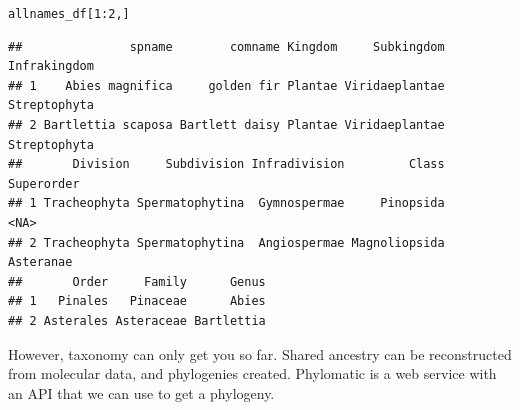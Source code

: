 \begin{knitrout}
\begin{kframe}
\begin{alltt}
allnames_df[1:2, ]
\end{alltt}
\begin{verbatim}
##               spname        comname Kingdom     Subkingdom Infrakingdom
## 1    Abies magnifica     golden fir Plantae Viridaeplantae Streptophyta
## 2 Bartlettia scaposa Bartlett daisy Plantae Viridaeplantae Streptophyta
##       Division     Subdivision Infradivision         Class Superorder
## 1 Tracheophyta Spermatophytina  Gymnospermae     Pinopsida       <NA>
## 2 Tracheophyta Spermatophytina  Angiospermae Magnoliopsida  Asteranae
##       Order     Family      Genus
## 1   Pinales   Pinaceae      Abies
## 2 Asterales Asteraceae Bartlettia
\end{verbatim}
\begin{alltt}

\end{alltt}
\end{kframe}
\end{knitrout}


However, taxonomy can only get you so far. Shared ancestry can be reconstructed from molecular data, and phylogenies created. Phylomatic is a web service with an API that we can use to get a phylogeny. 

